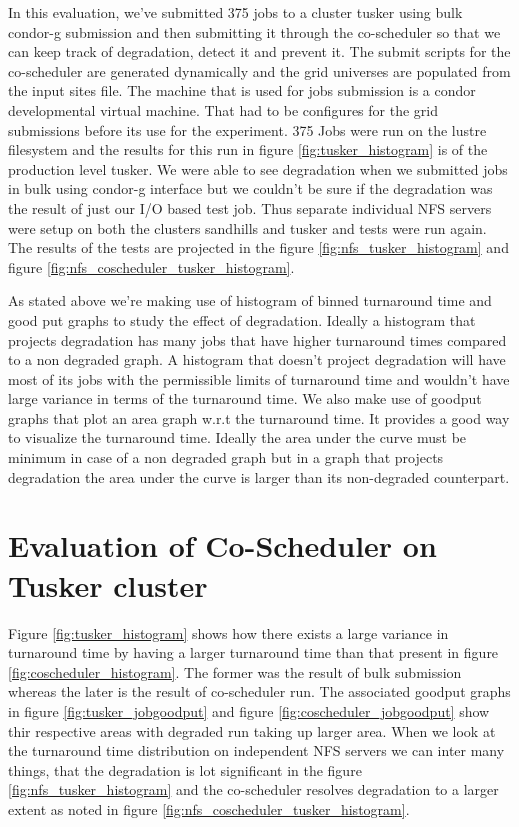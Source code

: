 \documentclass[ms,electronic,double]{nuthesis}
\begin{document}
In this evaluation, we've submitted 375 jobs to a cluster tusker using bulk 
condor-g submission and then submitting it through the co-scheduler so that we 
can keep track of degradation, detect it and prevent it. The submit scripts for 
the co-scheduler are generated dynamically and the grid universes are populated 
from the input sites file. The machine that is used for jobs submission is a 
condor developmental virtual machine. That had to be configures for the grid 
submissions before its use for the experiment. 375 Jobs were run on the lustre 
filesystem and the results for this run in figure \ref{fig:tusker_histogram} is 
of the production level tusker. We were able to see degradation when we 
submitted jobs in bulk using condor-g interface but we couldn't be sure if the 
degradation was the result of just our I/O based test job. Thus separate 
individual NFS servers were setup on both the clusters sandhills and tusker and 
tests were run again. The results of the tests are projected in the figure \ref{fig:nfs_tusker_histogram} 
and figure \ref{fig:nfs_coscheduler_tusker_histogram}.

As stated above we're making use of histogram of binned turnaround time and good 
put graphs to study the effect of degradation. Ideally a histogram that projects 
degradation has many jobs that have higher turnaround times compared to a non 
degraded graph. A histogram that doesn't project degradation will have most of 
its jobs with the permissible limits of turnaround time and wouldn't have large 
variance in terms of the turnaround time. We also make use of goodput graphs 
that plot an area graph w.r.t the turnaround time. It provides a good way to 
visualize the turnaround time. Ideally the area under the curve must be minimum 
in case of a non degraded graph but in a graph that projects degradation the 
area under the curve is larger than its non-degraded counterpart.
\newpage
\section{Evaluation of Co-Scheduler on Tusker cluster}
Figure \ref{fig:tusker_histogram} shows how there exists a large variance in 
turnaround time by having a larger turnaround time than that present in figure 
\ref{fig:coscheduler_histogram}. The former was the result of bulk submission 
whereas the later is the result of co-scheduler run. The associated goodput 
graphs in figure \ref{fig:tusker_jobgoodput} and figure \ref{fig:coscheduler_jobgoodput} 
show thir respective areas with degraded run taking up larger area. When we look 
at the turnaround time distribution on independent NFS servers we can inter many 
things, that the degradation is lot significant in the figure \ref{fig:nfs_tusker_histogram} and the co-scheduler 
resolves degradation to a larger extent as noted in figure 
\ref{fig:nfs_coscheduler_tusker_histogram}.
\end{document}

